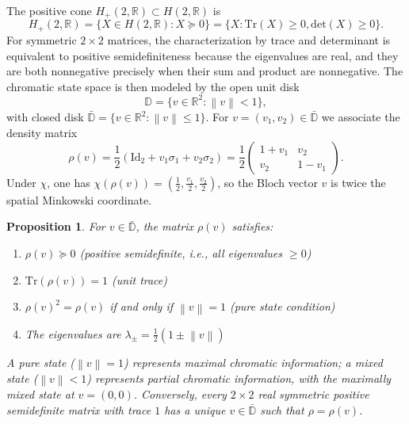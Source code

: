 \documentclass[11pt]{article}
\theoremstyle{plain}
\newtheorem{proposition}[theorem]{Proposition}
\theoremstyle{definition}
\theoremstyle{remark}
\newcommand{\R}{\mathbb{R}}
\newcommand{\D}{\mathbb{D}}
\newcommand{\norm}[1]{\left\lVert #1 \right\rVert}
\newcommand{\Tr}{\mathrm{Tr}}
\newcommand{\Det}{\mathrm{det}}
\newcommand{\Id}{\mathrm{Id}}
\begin{document}
The positive cone $H_+(2,\R) \subset H(2,\R)$ is
\begin{equation}
H_+(2,\R) = \{ X \in H(2,\R) : X \succeq 0 \} = \{ X : \Tr(X) \geq 0, \Det(X) \geq 0 \}.
\end{equation}
For symmetric $2 \times 2$ matrices, the characterization by trace and determinant is equivalent to positive semidefiniteness because the eigenvalues are real, and they are both nonnegative precisely when their sum and product are nonnegative. The chromatic state space is then modeled by the open unit disk
\begin{equation}
\D = \{ v \in \R^2 : \norm{v} < 1 \},
\end{equation}
with closed disk $\bar{\D} = \{ v \in \R^2 : \norm{v} \leq 1 \}$. For $v = (v_1, v_2) \in \bar{\D}$ we associate the density matrix
\begin{equation}
\boxed{
\rho(v) = \frac{1}{2}\left( \Id_2 + v_1 \sigma_1 + v_2 \sigma_2 \right) = \frac{1}{2} \begin{pmatrix} 1 + v_1 & v_2 \\ v_2 & 1 - v_1 \end{pmatrix}.
}
\end{equation}
Under $\chi$, one has $\chi(\rho(v)) = (\frac{1}{2}, \frac{v_1}{2}, \frac{v_2}{2})$, so the Bloch vector $v$ is twice the spatial Minkowski coordinate.

\begin{proposition}
\label{prop:density-props}
For $v \in \bar{\D}$, the matrix $\rho(v)$ satisfies:
\begin{enumerate}[label=(\roman*)]
    \item $\rho(v) \succeq 0$ (positive semidefinite, i.e., all eigenvalues $\geq 0$)
    \item $\Tr(\rho(v)) = 1$ (unit trace)
    \item $\rho(v)^2 = \rho(v)$ if and only if $\norm{v} = 1$ (pure state condition)
    \item The eigenvalues are $\lambda_{\pm} = \frac{1}{2}(1 \pm \norm{v})$
\end{enumerate}
A pure state ($\norm{v} = 1$) represents maximal chromatic information; a mixed state
($\norm{v} < 1$) represents partial chromatic information, with the maximally mixed state
at $v = (0,0)$. Conversely, every $2 \times 2$ real symmetric positive semidefinite matrix with trace $1$
has a unique $v \in \bar{\D}$ such that $\rho = \rho(v)$.
\end{proposition}
\end{document}
